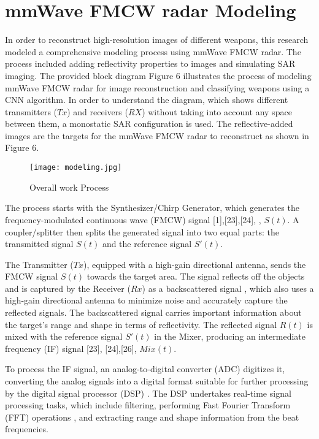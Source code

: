 \documentclass[journal,article,submit,pdftex,moreauthors]{Definitions/mdpi}
\begin{document}
\section{mmWave FMCW radar Modeling}
In order to reconstruct high-resolution images of different weapons, this research modeled a comprehensive modeling process using mmWave FMCW radar. The process included adding reflectivity properties to images and simulating SAR imaging. 
The provided block diagram Figure 6 illustrates the process of modeling mmWave FMCW radar for image reconstruction and classifying weapons using a CNN algorithm. In order to understand the diagram, which shows different transmitters (\(Tx\)) and receivers (\(RX\)) without taking into account any space between them, a monostatic SAR configuration is used. The reflective-added images are the targets for the mmWave FMCW radar to reconstruct as shown in Figure 6.
\begin{figure}[h]
  \centering
  \texttt{[image: modeling.jpg]}
  \caption{Overall work Process}
  \label{Figure:}
\end{figure}
The process starts with the Synthesizer/Chirp Generator, which generates the frequency-modulated continuous wave (FMCW) signal [1],[23],[24], \cite{25,26,27,28}, \( S(t) \). A coupler/splitter then splits the generated signal into two equal parts: the transmitted signal \( S(t) \) and the reference signal \( S'(t) \).

The Transmitter (\(Tx\)), equipped with a high-gain directional antenna, sends the FMCW signal \( S(t) \) towards the target area. The signal reflects off the objects and is captured by the Receiver (\(Rx\)) as a backscattered signal \cite{chandrawadde2024modeling, chandrawadde2024ml}, which also uses a high-gain directional antenna to minimize noise and accurately capture the reflected signals. The backscattered signal carries important information about the target’s range and shape in terms of reflectivity. The reflected signal \( R(t) \) is mixed with the reference signal \( S'(t) \) in the Mixer, producing an intermediate frequency (IF) signal [23], [24],[26], \( Mix(t) \). 


To process the IF signal, an analog-to-digital converter (ADC) digitizes it, converting the analog signals into a digital format suitable for further processing by the digital signal processor (DSP) \cite{25,27,28}. The DSP undertakes real-time signal processing tasks, which include filtering, performing Fast Fourier Transform (FFT) operations \cite{29, 30, 31, 32}, and extracting range and shape information from the beat frequencies. 
\end{document}
